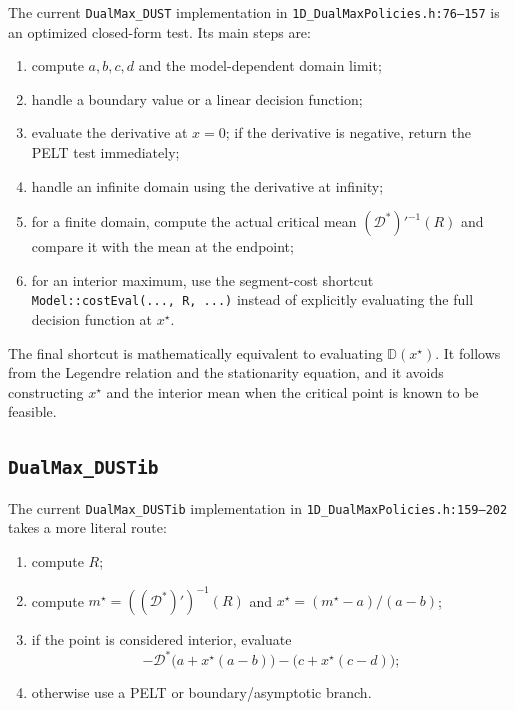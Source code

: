 \documentclass[11pt]{article}
\newcommand{\Dstar}{\mathcal{D}^*}
\begin{document}
The current \texttt{DualMax\_DUST} implementation in
\texttt{1D\_DualMaxPolicies.h:76--157} is an optimized closed-form test.
Its main steps are:

\begin{enumerate}
  \item compute $a,b,c,d$ and the model-dependent domain limit;
  \item handle a boundary value or a linear decision function;
  \item evaluate the derivative at $x=0$; if the derivative is negative,
        return the PELT test immediately;
  \item handle an infinite domain using the derivative at infinity;
  \item for a finite domain, compute the actual critical mean
        $(\Dstar)'^{-1}(R)$ and compare it with the mean at the endpoint;
  \item for an interior maximum, use the segment-cost shortcut
        \texttt{Model::costEval(..., R, ...)} instead of explicitly
        evaluating the full decision function at $x^\star$.
\end{enumerate}

The final shortcut is mathematically equivalent to evaluating
$\mathbb{D}(x^\star)$.  It follows from the Legendre relation and the
stationarity equation, and it avoids constructing $x^\star$ and the
interior mean when the critical point is known to be feasible.

\subsection{\texttt{DualMax\_DUSTib}}

The current \texttt{DualMax\_DUSTib} implementation in
\texttt{1D\_DualMaxPolicies.h:159--202} takes a more literal route:

\begin{enumerate}
  \item compute $R$;
  \item compute $m^\star=((\Dstar)')^{-1}(R)$ and
        $x^\star=(m^\star-a)/(a-b)$;
  \item if the point is considered interior, evaluate
        \begin{equation}
          -\Dstar\bigl(a+x^\star(a-b)\bigr)
          -\bigl(c+x^\star(c-d)\bigr);
          \label{eq:dustib-direct}
        \end{equation}
  \item otherwise use a PELT or boundary/asymptotic branch.
\end{enumerate}
\end{document}
